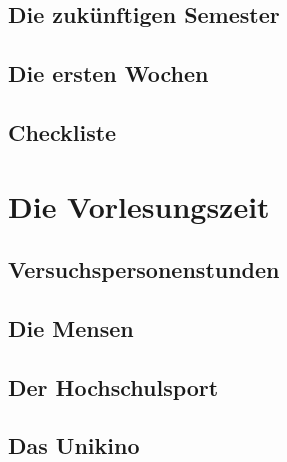 \documentclass[12pt, a4paper]{article}
\newif\ifinfo
\begin{document}
	\subsection{Die zukünftigen Semester}
	

	\pagebreak

	\subsection{Die ersten Wochen}
	
\fi 
 
\pagebreak

\subsection{Checkliste}
\ifinfo

\else

\fi 


\section{Die Vorlesungszeit}
\ifinfo
	\subsection{Der Stundenplan}
	
	
\else
	\subsection{Versuchspersonenstunden}
	
\fi 

\subsection{Die Mensen}


\subsection{Der Hochschulsport}


\subsection{Das Unikino}

\end{document}
